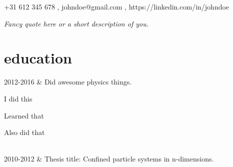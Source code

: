 \documentclass[]{cv-roald}
\begin{document}
\pagestyle{empty} %

{\faMobile \hspace{\FAspace} +31 612 345 678 \sep \faEnvelope \hspace{\FAspace} johndoe@gmail.com \sep \faLinkedinSquare \hspace{\FAspace} https://linkedin.com/in/johndoe
}

\textit{Fancy quote here or a short description of you.}

\section*{education}
\begin{tabularcv}
    2012-2016   &   
                    \newline Did awesome physics things.
                    \begin{tabitemize}
                        \item I did this
                        \item Learned that
                        \item Also did that
                    \end{tabitemize} 
                    \\[\vspacepar] %
    2010-2012   &   
                    \newline Thesis title: Confined particle systems in n-dimensions.
\end{tabularcv}
\end{document}

